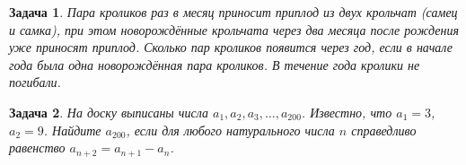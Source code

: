 \documentclass[12pt, a4paper]{article}
\newtheorem{problem}{Задача}
\begin{document}
\begin{problem}
Пара кроликов раз в месяц приносит приплод из двух крольчат (самец и самка), при этом новорождённые крольчата через два месяца после рождения уже приносят приплод. Сколько пар кроликов появится через год, если в начале года была одна новорождённая пара кроликов. В течение года кролики не погибали.
\begin{sol}

\end{sol}
\end{problem}



\begin{problem}
На доску выписаны числа $a_1, a_2, a_3, \ldots, a_200$. Известно, что $a_1 = 3$, $a_2 = 9$. Найдите $a_{200}$, если для любого натурального числа $n$ справедливо равенство $a_{n+2} = a_{n+1} - a_n$.
\begin{sol}

\end{sol}
\end{problem}




% 
\end{document}

